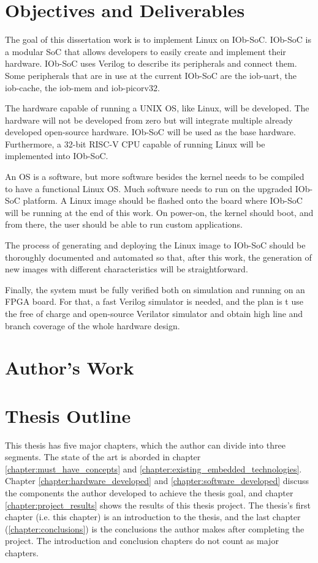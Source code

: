 \section{Objectives and Deliverables}
\label{section:objectives}
The goal of this dissertation work is to implement Linux on IOb-SoC. IOb-SoC is a modular SoC that allows developers to easily create and implement their hardware. IOb-SoC uses Verilog to describe its peripherals and connect them. Some peripherals that are in use at the current IOb-SoC are the iob-uart, the iob-cache, the iob-mem and iob-picorv32.

The hardware capable of running a UNIX OS, like Linux, will be developed. The hardware will not be developed from zero but will integrate multiple already developed open-source hardware. IOb-SoC will be used as the base hardware. Furthermore, a 32-bit RISC-V CPU capable of running Linux will be implemented into IOb-SoC.

An OS is a software, but more software besides the kernel needs to be compiled to have a functional Linux OS. Much software needs to run on the upgraded IOb-SoC platform. A Linux image should be flashed onto the board where IOb-SoC will be running at the end of this work. On power-on, the kernel should boot, and from there, the user should be able to run custom applications. 

The process of generating and deploying the Linux image to IOb-SoC should be thoroughly documented and automated so that, after this work, the generation of new images with different characteristics will be straightforward.

Finally, the system must be fully verified both on simulation and running on an FPGA board. For that, a fast Verilog simulator is needed, and the plan is t use the free of charge and open-source Verilator simulator and obtain high line and branch coverage of the whole hardware design.

\section{Author's Work}
\label{section:authors_work}

\section{Thesis Outline}
\label{section:thesis_outline}
This thesis has five major chapters, which the author can divide into three segments. The state of the art is aborded in chapter \ref{chapter:must_have_concepts} and \ref{chapter:existing_embedded_technologies}. Chapter \ref{chapter:hardware_developed} and \ref{chapter:software_developed} discuss the components the author developed to achieve the thesis goal, and chapter \ref{chapter:project_results} shows the results of this thesis project. The thesis's first chapter (i.e. this chapter) is an introduction to the thesis, and the last chapter (\ref{chapter:conclusions}) is the conclusions the author makes after completing the project. The introduction and conclusion chapters do not count as major chapters.

